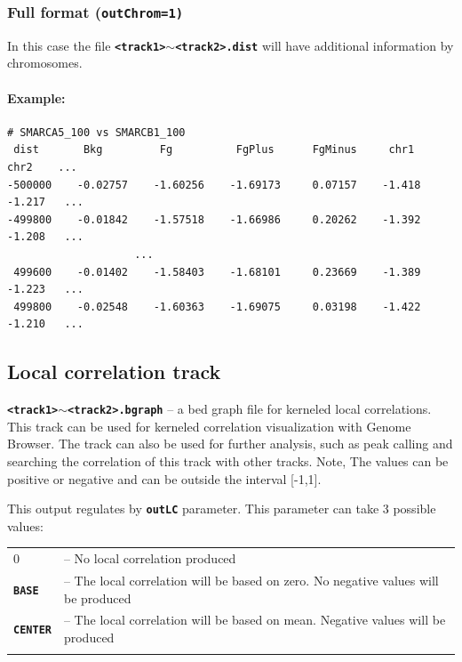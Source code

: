 \documentclass{article}
\newcommand{\tw}{\textwidth}
\newcommand{\prm}[1]{\texttt{\textbf{{#1}}}}
\begin{document}
\subsubsection{Full format (\prm{outChrom=1)}}
In this case the file \prm{<track1>$\sim$<track2>.dist} will have additional information by chromosomes.

\paragraph{Example:}\;\;
\begin{minipage}{0.85\tw}
\begin{shaded} 
\begin{verbatim}
# SMARCA5_100 vs SMARCB1_100
 dist       Bkg         Fg          FgPlus      FgMinus     chr1      chr2    ...
-500000    -0.02757    -1.60256    -1.69173     0.07157    -1.418    -1.217   ...
-499800    -0.01842    -1.57518    -1.66986     0.20262    -1.392    -1.208   ...
                    ...
 499600    -0.01402    -1.58403    -1.68101     0.23669    -1.389    -1.223   ...
 499800    -0.02548    -1.60363    -1.69075     0.03198    -1.422    -1.210   ...
\end{verbatim}
\end{shaded}
\end{minipage}
\subsection{Local correlation track}\label{LC}

\prm{<track1>$\sim$<track2>.bgraph} -- a bed graph file for kerneled local correlations. This track can be used for kerneled correlation visualization with Genome Browser. The track can also be used for further analysis, such as peak calling and searching the correlation of this track with other tracks. 
Note, The values can be positive or negative and can be outside the interval [-1,1].


This output regulates by \prm{outLC} parameter. This parameter can take 3 possible values:

\begin{tabular}{ll}\\
0	         & -- No local correlation produced\\
\prm{BASE}   & -- The local correlation will be based on zero. No negative values will be produced\\
\prm{CENTER} & -- The local correlation will be based on mean. Negative values will be produced\\ \\
\end{tabular}
\end{document}
